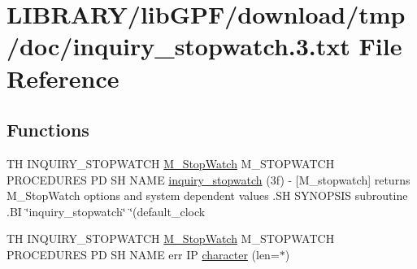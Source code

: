 \hypertarget{inquiry__stopwatch_83_8txt}{}\section{L\+I\+B\+R\+A\+R\+Y/lib\+G\+P\+F/download/tmp/doc/inquiry\+\_\+stopwatch.3.txt File Reference}
\label{inquiry__stopwatch_83_8txt}
\subsection*{Functions}
\begin{DoxyCompactItemize}
\item 
TH I\+N\+Q\+U\+I\+R\+Y\+\_\+\+S\+T\+O\+P\+W\+A\+T\+CH \hyperlink{option__stopwatch_83_8txt_aa2011fc45a5e502e87ee50996a8a9305}{M\+\_\+\+Stop\+Watch} M\+\_\+\+S\+T\+O\+P\+W\+A\+T\+CH P\+R\+O\+C\+E\+D\+U\+R\+ES PD SH N\+A\+ME \hyperlink{inquiry__stopwatch_83_8txt_a4dada9d717f128f440143c7c9e065435}{inquiry\+\_\+stopwatch} (3f) -\/ \mbox{[}\+M\+\_\+stopwatch\mbox{]} returns M\+\_\+\+Stop\+Watch options and system dependent values .\+S\+H S\+Y\+N\+O\+P\+S\+I\+S subroutine .\+B\+I \char`\"{}inquiry\+\_\+stopwatch\char`\"{} \char`\"{}(default\+\_\+clock
\item 
TH I\+N\+Q\+U\+I\+R\+Y\+\_\+\+S\+T\+O\+P\+W\+A\+T\+CH \hyperlink{option__stopwatch_83_8txt_aa2011fc45a5e502e87ee50996a8a9305}{M\+\_\+\+Stop\+Watch} M\+\_\+\+S\+T\+O\+P\+W\+A\+T\+CH P\+R\+O\+C\+E\+D\+U\+R\+ES PD SH N\+A\+ME err IP \hyperlink{inquiry__stopwatch_83_8txt_ab2e20a25f5ea8f5986290d5c6d860dac}{character} (len=$\ast$)
\end{DoxyCompactItemize}
